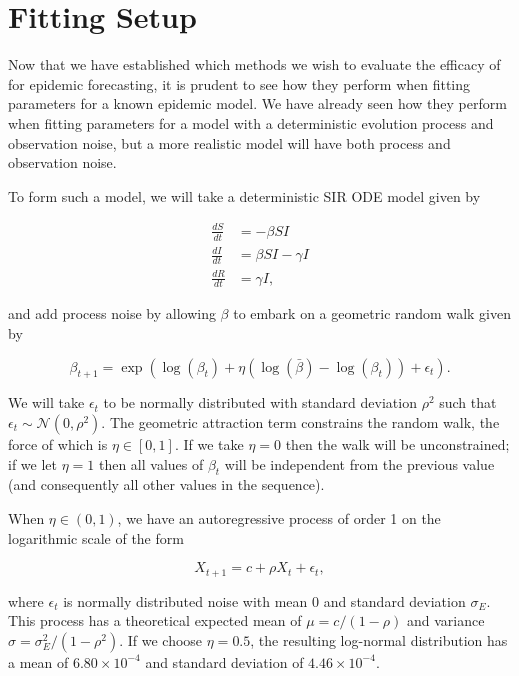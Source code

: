 
\section{Fitting Setup}

	Now that we have established which methods we wish to evaluate the efficacy of for epidemic forecasting, it is prudent to see how they perform when fitting parameters for a known epidemic model. We have already seen how they perform when fitting parameters for a model with a deterministic evolution process and observation noise, but a more realistic model will have both process and observation noise.

	To form such a model, we will take a deterministic SIR ODE model given by

	\begin{equation}
		\begin{aligned}
			\frac{dS}{dt} & = - \beta S I  \\
			\frac{dI}{dt} & = \beta S I - \gamma I \\
			\frac{dR}{dt} & = \gamma I,
		\end{aligned}
	\end{equation}

	and add process noise by allowing $\beta$ to embark on a geometric random walk given by

	\begin{equation}\label{betaautoreg}
		\beta_{t+1} = \exp \left( \log(\beta_{t}) + \eta (\log(\bar{\beta}) - \log(\beta_{t})) + \epsilon_{t} \right).
	\end{equation}

	We will take $\epsilon_{t}$ to be normally distributed with standard deviation $\rho^2$ such that $\epsilon_{t} \sim \mathcal{N}(0,\rho^2)$. The geometric attraction term constrains the random walk, the force of which is $\eta \in [0,1]$. If we take $\eta = 0$ then the walk will be unconstrained; if we let $\eta = 1$ then all values of $\beta_t$ will be independent from the previous value (and consequently all other values in the sequence).

	When $\eta \in (0,1)$, we have an autoregressive process of order 1 on the logarithmic scale of the form

	\begin{equation}
		X_{t+1} = c + \rho X_t + \epsilon_t ,
	\end{equation}

	where $\epsilon_t$ is normally distributed noise with mean 0 and standard deviation $\sigma_E$. This process has a theoretical expected mean of $\mu = c / (1 - \rho)$ and variance $\sigma = \sigma_E^2 / (1 - \rho^2)$. If we choose $\eta = 0.5$, the resulting log-normal distribution has a mean of $6.80 \times 10^{-4}$ and standard deviation of $4.46 \times 10^{-4}$.

